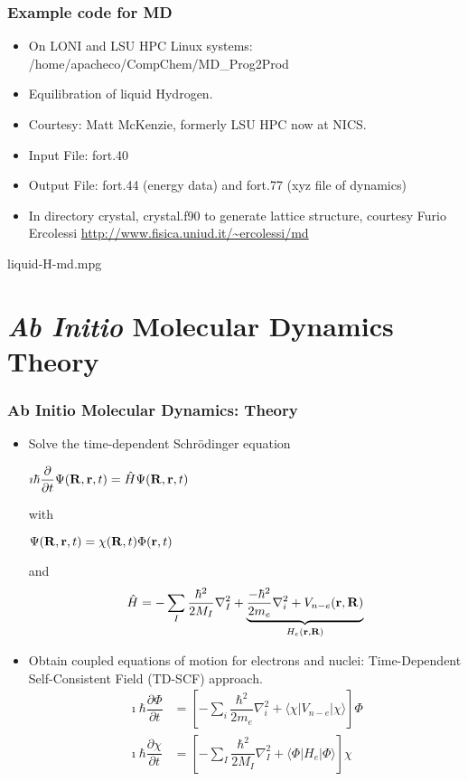 \documentclass[slidestop,mathserif,compress,xcolor=svgnames]{beamer}
\begin{document}
\begin{frame}
  \frametitle{\small Example code for MD}
  \begin{itemize}
  \item On LONI and LSU HPC Linux systems: /home/apacheco/CompChem/MD\_Prog2Prod
  \item Equilibration of liquid Hydrogen.
  \item Courtesy: Matt McKenzie, formerly LSU HPC now at NICS.
  \item Input File: fort.40
  \item Output File: fort.44 (energy data) and fort.77 (xyz file of dynamics)
  \item In directory crystal, crystal.f90 to generate lattice structure, courtesy Furio Ercolessi {\color{Blue}\url{http://www.fisica.uniud.it/~ercolessi/md}}
  \end{itemize}
  \begin{center}
                 {liquid-H-md.mpg}
  \end{center}
\end{frame}

\section{{\it Ab Initio} Molecular Dynamics Theory} 
\begin{frame}
  \frametitle{\small Ab Initio Molecular Dynamics: Theory}
  \begin{itemize}
  \item Solve the time-dependent Schr\"{o}dinger equation
    \begin{center}
      $\imath\hbar\dfrac{\partial}{\partial t}\Psi({\bf R},{\bf r},t) = \hat{H}\Psi({\bf R},{\bf r},t)$
    \end{center}
    with 
    \begin{center}
      $\Psi({\bf R},{\bf r},t) = \chi({\bf R},t)\Phi({\bf r},t)$
    \end{center}
    and 
    \begin{align*}
      \hat{H} = -\sum_I\dfrac{\hbar^2}{2M_I}\nabla^2_I +\underbrace{\dfrac{-\hbar^2}{2m_e}\nabla^2_i + V_{n-e}(\bf r,R)}_{H_e(\bf r,R)}
    \end{align*}
  \item Obtain coupled equations of motion for electrons and nuclei: Time-Dependent Self-Consistent Field (TD-SCF) approach.
    \begin{align*}
      \imath\hbar\dfrac{\partial\Phi}{\partial t} &= \left[-\sum_i\dfrac{\hbar^2}{2m_e}\nabla^2_i + \langle\chi|V_{n-e}|\chi\rangle\right]\Phi\\
      \imath\hbar\dfrac{\partial\chi}{\partial t} &= \left[-\sum_I\dfrac{\hbar^2}{2M_I}\nabla^2_I + \langle\Phi|H_e|\Phi\rangle\right]\chi
    \end{align*}
  \end{itemize}
\end{frame}
\end{document}
